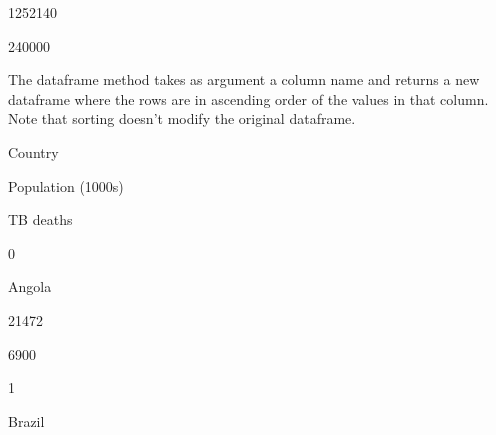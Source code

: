 \documentclass[letterpaper,10pt,english]{sphinxmanual}
\begin{document}
1252140





240000









The dataframe method  takes as argument a column name and returns a new dataframe where the rows are in ascending order of the values in that column. Note that sorting doesn’t modify the original dataframe.




















Country





Population (1000s)





TB deaths









0





Angola





21472





6900









1





Brazil
\end{document}
